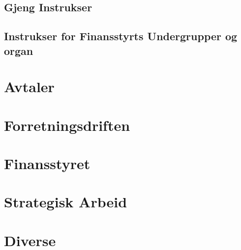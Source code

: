 \documentclass[11pt, a4paper, twosided]{book}
\begin{document}
\chapter*{Gjeng Instrukser}




































\chapter*{Instrukser for Finansstyrts Undergrupper og organ}














\part{Avtaler}




\part{Forretningsdriften}





\part{Finansstyret}





\part{Strategisk Arbeid}




\part{Diverse}


\end{document}
